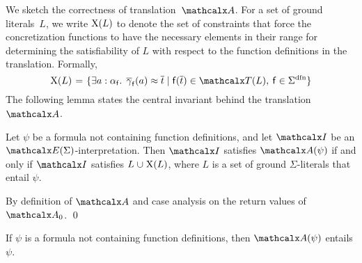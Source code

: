 We sketch the correctness of translation~$\conv$.
For a set of ground literals~$L$,
we write $\mathrm{X}( L )$ to denote the set of constraints that
force the concretization functions to have the necessary elements in their
range for determining the satisfiability of $L$ with respect to the function
definitions in the translation.
Formally,
\[\absconstraints( L ) \vthinspace=\vthinspace \smash{\{ \exists a : {\fargtype{\con{f}}}.\;\, \vecfarg{\con{f}}( a ) \teq \nobreak \vec t
\nobreak\mid\allowbreak \con{f}( \vec t ) \in \terms( L ),\: \con{f} \in \sfundefs{\Sigma}
\}}\]
The following lemma states the central invariant behind the translation $\conv$.

\begin{lemma}\label{lem:conv}
Let $\psi$ be a formula not containing function definitions,
and let $\I$ be an $\extendsig{\Sigma}$-interpretation.
Then $\I$ satisfies $\conv( \psi )$ if and only if
$\I$ satisfies $L \cup \absconstraints( L )$, where $L$ is a set of ground $\Sigma$-literals that entail $\psi$.
\end{lemma}
\begin{proofsketch}
By definition of $\conv$ and case analysis on the return values of $\conv_0$.
\qed
\end{proofsketch}

\begin{corollary}\label{cor:conv}
If $\psi$ is a formula not containing function definitions, then $\conv( \psi )$ entails $\psi$.
\end{corollary}

